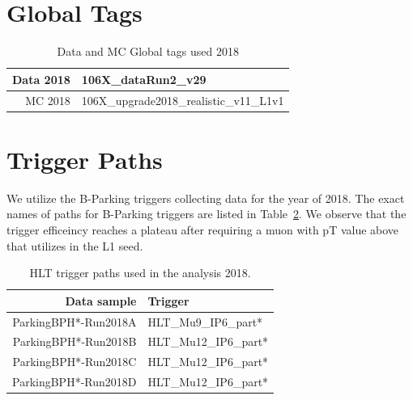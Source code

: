 \section{Global Tags}
\begin{table}[htb]
\caption{Data and MC Global tags used 2018}
\begin{center}
\begin{tabular}{r|l}\hline
 Data 2018 & 106X\_dataRun2\_v29 \\
 \hline
 MC 2018   & 106X\_upgrade2018\_realistic\_v11\_L1v1 \\
 \hline
\end{tabular}
\label{tab:GT}
\end{center}
\end{table}


\section{Trigger Paths}
We utilize the B-Parking triggers collecting data for the year of 2018.
The exact names of paths for B-Parking triggers are listed in Table~\ref{tab:triggers18}.
We observe that the trigger efficeincy reaches a plateau after requiring a muon with pT value above that utilizes in the L1 seed.

\begin{table}[htb]
\caption{HLT trigger paths used in the analysis 2018.}
\begin{center}
\begin{tabular}{r|l}\hline
\hline
 Data sample & Trigger \\
\hline
 ParkingBPH*-Run2018A & HLT\_Mu9\_IP6\_part* \\
 \hline
 ParkingBPH*-Run2018B & HLT\_Mu12\_IP6\_part* \\
 ParkingBPH*-Run2018C & HLT\_Mu12\_IP6\_part* \\
 ParkingBPH*-Run2018D & HLT\_Mu12\_IP6\_part* \\
 \hline
 \hline
\end{tabular}
\label{tab:triggers18}
\end{center}
\end{table}

